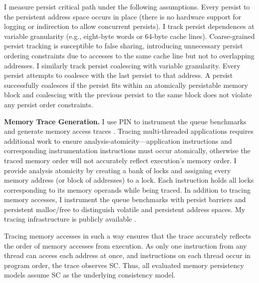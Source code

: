 I measure persist critical path under the following assumptions.
Every persist to the persistent address space occurs in place (there is no hardware support for logging or indirection to allow concurrent persists).
I track persist dependences at variable granularity (e.g., eight-byte words or 64-byte cache lines).
Coarse-grained persist tracking is susceptible to false sharing, introducing unnecessary persist ordering constraints due to accesses to the same cache line but not to overlapping addresses.
I similarly track persist coalescing with variable granularity.
Every persist attempts to coalesce with the last persist to that address.
A persist successfully coalesces if the persist fits within an atomically persistable memory block and coalescing with the previous persist to the same block does not violate any persist order constraints.

\textbf{Memory Trace Generation.}
I use PIN to instrument the queue benchmarks and generate memory access traces \cite{LukCohn05}.
Tracing multi-threaded applications requires additional work to ensure analysis-atomicity---application instructions and corresponding instrumentation instructions must occur atomically, otherwise the traced memory order will not accurately reflect execution's memory order.
I provide analysis atomicity by creating a bank of locks and assigning every memory address (or block of addresses) to a lock.
Each instruction holds all locks corresponding to its memory operands while being traced.
In addition to tracing memory accesses, I instrument the queue benchmarks with persist barriers and persistent malloc/free to distinguish volatile and persistent address spaces.
My tracing infrastructure is publicly available \cite{AtomicMemoryTrace}.

Tracing memory accesses in such a way ensures that the trace accurately reflects the order of memory accesses from execution.
As only one instruction from any thread can access each address at once, and instructions on each thread occur in program order, the trace observes SC.
Thus, all evaluated memory persistency models assume SC as the underlying consistency model.

